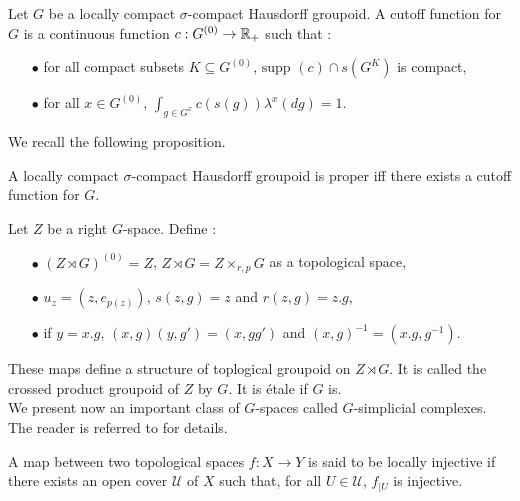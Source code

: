 Let $G$ be a locally compact $\sigma$-compact Hausdorff groupoid. A cutoff function for $G$ is a continuous function $c : G^{(0)} \rightarrow \mathbb R_+$ such that :
\begin{itemize}
\item[$\bullet$] for all compact subsets $K\subseteq G^{(0)}$, $\text{supp }(c)\cap s(G^K)$ is compact,
\item[$\bullet$] for all $x\in G^{(0)}$, $\int_{g\in G^x} c(s(g)) \lambda^x(dg) = 1$.
\end{itemize}

We recall the following proposition.

\begin{prop}
A locally compact $\sigma$-compact Hausdorff groupoid is proper iff there exists a cutoff function for $G$. 
\end{prop}

Let $Z$ be a right $G$-space. Define :
\begin{itemize}
\item[$\bullet$] $(Z\rtimes G)^{(0)} = Z$, $Z\rtimes G = Z\times_{r,p} G$ as a topological space,
\item[$\bullet$] $u_{z}= (z,e_{p(z)})$, $ s(z,g) = z$ and $r(z,g)=z.g$, 
\item[$\bullet$] if $y = x.g$, $(x,g)(y,g')= (x,gg') $ and $(x,g)^{-1} = (x.g,g^{-1})$.
\end{itemize}

These maps define a structure of toplogical groupoid on $Z\rtimes G$. It is called the crossed product groupoid of $Z$ by $G$. It is étale if $G$ is.\\

We present now an important class of $G$-spaces called $G$-simplicial complexes. The reader is referred to \cite{TuBC2} for details. 

\begin{definition}
A map between two topological spaces $f : X\rightarrow Y$ is said to be locally injective if there exists an open cover $\mathcal U$ of $X$ such that, for all $U\in \mathcal U$, $f_{|U}$ is injective.
\end{definition}

